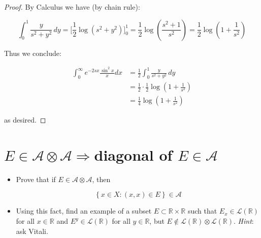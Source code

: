 \documentclass{qlnotes-export}
\begin{document}
\begin{proof}
By Calculus we have (by chain rule):

\[\int_{0}^{1}\frac{y}{s^{2} + y^{2}}\, dy = \lbrack\frac{1}{2}\log(s^{2} + y^{2})\rbrack_{0}^{1} = \frac{1}{2}\log(\frac{s^{2} + 1}{s^{2}}) = \frac{1}{2}\log(1 + \frac{1}{s^{2}})\]

Thus we conclude:

\[\begin{matrix}
{\int_{0}^{\infty}e^{- 2sx}\frac{\sin^{2}x}{x} dx} & {= \frac{1}{2}\int_{0}^{1}\frac{y}{s^{2} + y^{2}}\, dy} \\
 & {= \frac{1}{2} \cdot \frac{1}{2}\log(1 + \frac{1}{s^{2}})} \\
 & {= \frac{1}{4}\log(1 + \frac{1}{s^{2}})}
\end{matrix}\]

as desired.

\end{proof}

\section{\texorpdfstring{\(E \in \mathcal{A} \otimes \mathcal{A}\Longrightarrow\)diagonal of \(E \in \mathcal{A}\)}{E \textbackslash in \textbackslash mathcal\{A\} \textbackslash otimes \textbackslash mathcal\{A\}\textbackslash Longrightarrowdiagonal of E \textbackslash in \textbackslash mathcal\{A\}}}\label{einmathcalaotimesmathcala-impliesdiagonal-of-e-in-mathcala}

\begin{itemize}
\item
  Prove that if \(E \in \mathcal{A} \otimes \mathcal{A}\), then

  \[\left\{ {x \in X:(x,x) \in E} \right\} \in \mathcal{A}\]
\item
  Using this fact, find an example of a subset \(E \subset {\mathbb{R}} \times {\mathbb{R}}\) such that \(E_{x} \in \mathcal{L}({\mathbb{R}})\) for all \(x \in {\mathbb{R}}\) and \(E^{y} \in \mathcal{L}({\mathbb{R}})\) for all \(y \in {\mathbb{R}}\), but \(E \notin \mathcal{L}({\mathbb{R}}) \otimes \mathcal{L}({\mathbb{R}})\). \emph{Hint}: ask Vitali.
\end{itemize}
\end{document}
